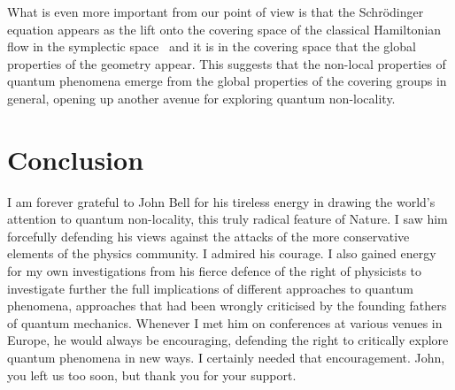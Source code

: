 \documentclass[11pt]{article}
\begin{document}
What is even more important from our point of view is that the Schr\"{o}dinger equation appears as the lift onto the covering space of the classical Hamiltonian flow in the symplectic space~\cite{vgss84, mdgbh11} and it is 
in the covering space that the global properties of the geometry appear.  This suggests  that the non-local properties of quantum phenomena emerge from the global properties of the covering groups in general, opening up another avenue for exploring quantum non-locality.


\section{Conclusion}

 I am forever grateful to John Bell for his tireless energy in drawing the world's attention to quantum non-locality, this truly radical feature of Nature.  I saw him forcefully defending his views against the attacks of the more conservative elements of the physics community.  I admired his courage. I also gained energy for my own investigations from his fierce defence of the right of physicists to investigate further the full implications of different approaches to quantum phenomena, approaches that had been wrongly criticised by the founding fathers of quantum mechanics.
 Whenever I met him on conferences at various venues in Europe, he would always be encouraging, defending the right to critically explore quantum phenomena in new ways.  I certainly needed that encouragement.  John, you left us too soon, but thank you for your support.
\end{document}
